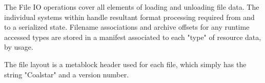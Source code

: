 The File IO operations cover all elements of loading and unloading file data. The individual systems within handle resultant format processing required from and to a serialized state. Filename associations and archive offsets for any runtime accessed types are stored in a manifest associated to each "type" of resource data, by usage.

The file layout is a metablock header used for each file, which simply has the string "Coalstar" and a version number.
